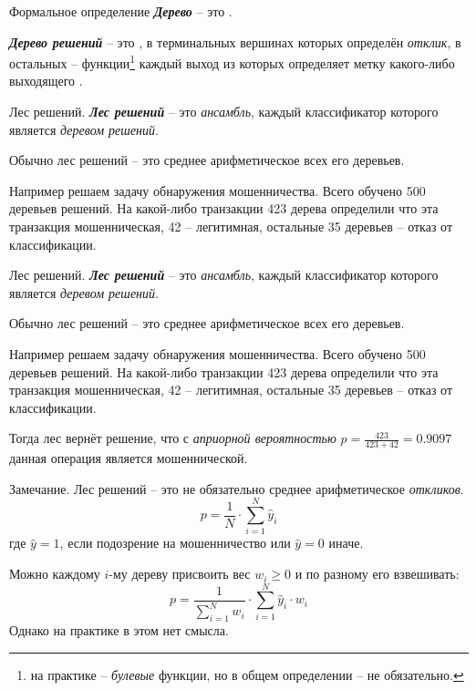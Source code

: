 \documentclass{beamer}
\newcommand{\termdef}[1]{\textbf{\textit{#1}}}
\newcommand{\term}{\textit}
\newcommand{\auditorium}[1]{\color{red}{\textbf{#1}}}
\begin{document}
\begin{frame}{Формальное определение}
	\termdef{Дерево} -- это   .
	
	\termdef{Дерево решений} -- это , в терминальных вершинах которых 
	определён \term{отклик}, в остальных  -- функции\footnote{
	на практике -- \term{булевые} функции, но в общем определении -- не обязательно.}
	каждый выход из которых определяет метку какого-либо выходящего .
\end{frame}

\begin{frame}{Лес решений.}
	\termdef{Лес решений} -- это \term{ансамбль}, каждый классификатор которого 
	является \term{деревом решений}.
	
	Обычно лес решений -- это среднее арифметическое всех его деревьев. 
	
	Например решаем задачу обнаружения мошенничества. Всего обучено 500 деревьев решений.
	На какой-либо транзакции 423 дерева определили что эта транзакция мошенническая,
	42 -- легитимная, остальные 35 деревьев -- отказ от классификации.
	
	\auditorium{Каков отклик данного леса?}
\end{frame}

\begin{frame}{Лес решений.}
	\termdef{Лес решений} -- это \term{ансамбль}, каждый классификатор которого 
	является \term{деревом решений}.
	
	Обычно лес решений -- это среднее арифметическое всех его деревьев. 
	
	Например решаем задачу обнаружения мошенничества. Всего обучено 500 деревьев решений.
	На какой-либо транзакции 423 дерева определили что эта транзакция мошенническая,
	42 -- легитимная, остальные 35 деревьев -- отказ от классификации.
	
	Тогда лес вернёт решение, что 
	с \term{априорной вероятностью}
	$p=\frac{423}{423+42} = 0.9097$ 
	данная операция является мошеннической.
\end{frame}

\begin{frame}
	\begin{block}{Замечание.}
	\small
	Лес решений -- это не обязательно среднее арифметическое \term{откликов}.
	\begin{equation*}
	p = \frac{1}{N} \cdot \sum_{i=1}^{N} \hat y_i
	\end{equation*}
	где $\hat y = 1$, если подозрение на мошенничество или $\hat y =0$ иначе.
	
	Можно каждому $i$-му дереву  присвоить вес $w_i \geqslant 0$ и по разному его взвешивать:
	\begin{equation*}
	p = \frac{1}{ \sum_{i=1}^{N} w_i}  \cdot \sum_{i=1}^{N} \hat y_i \cdot w_i
	\end{equation*}
	Однако на практике в этом нет смысла.
	\end{block}
\end{frame}
\end{document}
